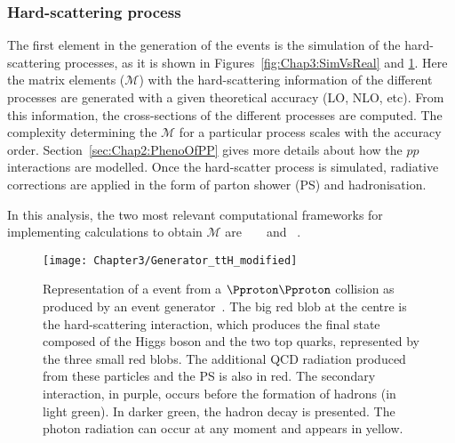 


\subsubsection{Hard-scattering process}
\label{sec:Chap3.1:MC:Steps:HardScattering}
The first element in the generation of the events is the simulation of the hard-scattering 
processes, as it is shown in Figures~\ref{fig:Chap3:SimVsReal} and \ref{fig:Chap3:ttHSimulated}.
Here the matrix elements ($\mathcal{M}$) with the hard-scattering information of the different processes are
generated with a given theoretical accuracy  (LO, NLO, etc). From this information, the cross-sections 
of the different processes are 
computed. %
The complexity determining the 
$\mathcal{M}$ for a particular process scales with the accuracy order. 
Section~\ref{sec:Chap2:PhenoOfPP} gives more details about how the \(pp\) interactions
are modelled.
Once the hard-scatter process is simulated, radiative corrections are 
applied in the form of parton shower (PS) and hadronisation. 

In this analysis, the two most relevant computational frameworks for implementing calculations 
to obtain $\mathcal{M}$ are \MGNLO~\cite{NNPDF:2014otw} 
\POWHEGBOX~\cite{Frixione:2007vw} and \Sherpa~\cite{Gleisberg:2008ta}.

 \begin{figure}
    \centering
    \texttt{[image: Chapter3/Generator\_ttH\_modified]}
    \caption{Representation of a \ttH event from a $\Pproton \Pproton$ collision as produced by an event generator~\cite{Gleisberg:2008ta}. 
    The big red blob at the centre is the hard-scattering interaction, which produces the final state composed of the Higgs 
    boson and the two top quarks, represented by the three small red blobs. 
    The additional QCD radiation produced from these particles and the PS is also in red. 
    The secondary interaction, in purple, occurs before the formation of hadrons (in light green). 
    In darker green, the hadron decay is presented. The photon radiation can occur at any moment and appears in yellow.}
    \label{fig:Chap3:ttHSimulated}
\end{figure}



